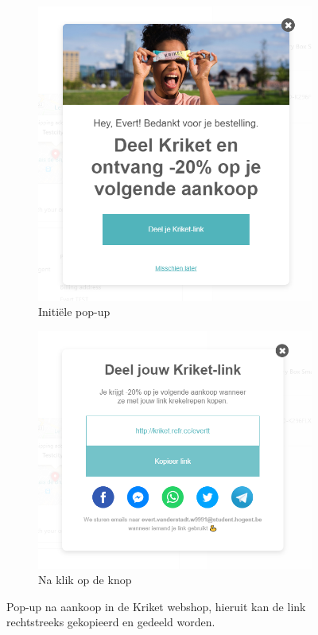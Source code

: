 \begin{figure}
	\centering
	\begin{subfigure}{.5\textwidth}
		\centering
		\includegraphics[width=.8\linewidth]{img/referral-pop-up-1.png}
		\caption{Initiële pop-up}
		\label{fig:referral-popup-webshop-1}
	\end{subfigure}%
	\begin{subfigure}{.5\textwidth}
		\centering
		\includegraphics[width=.9\linewidth]{img/referral-pop-up-2.png}
		\caption{Na klik op de knop}
		\label{fig:referral-popup-webshop-2}
	\end{subfigure}
	\caption{Pop-up na aankoop in de Kriket webshop, hieruit kan de link rechtstreeks gekopieerd en gedeeld worden.}
	\label{fig:referral-popup-webshop}
\end{figure}

